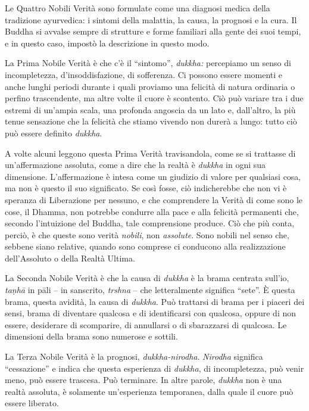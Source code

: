 Le Quattro Nobili Verità sono formulate come una diagnosi medica della
tradizione ayurvedica: i sintomi della malattia, la causa, la prognosi e
la cura. Il Buddha si avvalse sempre di strutture e forme familiari alla
gente dei suoi tempi, e in questo caso, impostò la descrizione in questo
modo.

La Prima Nobile Verità è che c'è il ``sintomo'', \emph{dukkha:}
percepiamo un senso di incompletezza, d'insoddisfazione, di sofferenza.
Ci possono essere momenti e anche lunghi periodi durante i quali
proviamo una felicità di natura ordinaria o perfino trascendente, ma
altre volte il cuore è scontento. Ciò può variare tra i due estremi di
un'ampia scala, una profonda angoscia da un lato e, dall'altro, la più
tenue sensazione che la felicità che stiamo vivendo non durerà a lungo:
tutto ciò può essere definito \emph{dukkha}.

A volte alcuni leggono questa Prima Verità travisandola, come se si
trattasse di un'affermazione assoluta, come a dire che la realtà è
\emph{dukkha} in ogni sua dimensione. L'affermazione è intesa come un
giudizio di valore per qualsiasi cosa, ma non è questo il suo
significato. Se così fosse, ciò indicherebbe che non vi è speranza di
Liberazione per nessuno, e che comprendere la Verità di come sono le
cose, il Dhamma, non potrebbe condurre alla pace e alla felicità
permanenti che, secondo l'intuizione del Buddha, tale comprensione
produce. Ciò che più conta, perciò, è che queste sono verità
\emph{nobili}, non \emph{assolute}. Sono nobili nel senso che, sebbene
siano relative, quando sono comprese ci conducono alla realizzazione
dell'Assoluto o della Realtà Ultima.

La Seconda Nobile Verità è che la causa di \emph{dukkha} è la brama
centrata sull'io, \emph{taṇhā} in pāli -- in sanscrito, \emph{trshna} --
che letteralmente significa ``sete''. È questa brama, questa avidità, la
causa di \emph{dukkha}. Può trattarsi di brama per i piaceri dei sensi,
brama di diventare qualcosa e di identificarsi con qualcosa, oppure di
non essere, desiderare di scomparire, di annullarsi o di sbarazzarsi di
qualcosa. Le dimensioni della brama sono numerose e sottili.

La Terza Nobile Verità è la prognosi, \emph{dukkha-nirodha}.
\emph{Nirodha} significa ``cessazione'' e indica che questa esperienza
di \emph{dukkha}, di incompletezza, può venir meno, può essere trascesa.
Può terminare. In altre parole, \emph{dukkha} non è una realtà assoluta,
è solamente un'esperienza temporanea, dalla quale il cuore può essere
liberato.

